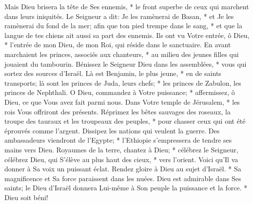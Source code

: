 Mais Dieu brisera la tête de Ses ennemis, * le front superbe de ceux qui marchent dans leurs iniquités.
Le Seigneur a dit: Je les ramènerai de Basan, * et Je les ramènerai du fond de la mer;
afin que ton pied trempe dans le sang, * et que la langue de tes chiens ait aussi sa part des ennemis.
Ils ont vu Votre entrée, ô Dieu, * l'entrée de mon Dieu, de mon Roi, qui réside dans le sanctuaire.
En avant marchaient les princes, associés aux chanteurs, * au milieu des jeunes filles qui jouaient du tambourin.
Bénissez le Seigneur Dieu dans les assemblées, * vous qui sortez des sources d'Israël.
Là est Benjamin, le plus jeune, * en de saints transports; là sont les princes de Juda, leurs chefs; * les princes de Zabulon, les princes de Nephthali.
O Dieu, commandez à Votre puissance; * affermissez, ô Dieu, ce que Vous avez fait parmi nous.
Dans Votre temple de Jérusalem, * les rois Vous offriront des présents.
Réprimez les bêtes sauvages des roseaux, la troupe des tauraux et les troupeaux des peuples, * pour chasser ceux qui ont été éprouvés comme l'argent. Dissipez les nations qui veulent la guerre.
Des ambassadeurs viendront de l'Egypte; * l'Ethiopie s'empressera de tendre ses mains vers Dieu.
Royaumes de la terre, chantez à Dieu; * célébrez le Seigneur, célébrez Dieu,
qui S'élève au plus haut des cieux, * vers l'orient. Voici qu'Il va donner à Sa voix un puissant éclat.
Rendez gloire à Dieu au sujet d'Israël. * Sa magnificence et Sa force paraissent dans les nuées.
Dieu est admirable dans Ses saints; le Dieu d'Israël donnera Lui-même à Son peuple la puissance et la force. * Dieu soit béni!

